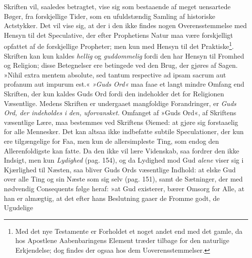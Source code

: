 \documentclass[12pt,a4paper]{book}
\newcommand{\opage}[1]{\marginnote{\footnotesize\textit{[#1]}}}
\begin{document}
Skriften vil, saaledes betragtet, vise sig som bestaaende af meget uensartede Bøger, fra forskjellige Tider, som en ufuldstændig Samling af historiske Actstykker. Det vil vise sig, at der i den ikke findes nogen Overensstemmelse med Hensyn til det Speculative, der efter Prophetiens Natur maa være forskjelligt opfattet af de forskjellige Propheter; men kun med Hensyn til det Praktiske\footnote{Med det nye Testamente er Forholdet et noget andet end med det gamle, da hos Apostlene Aabenbaringens Element træder tilbage for den naturlige Erkjendelse; dog findes der ogsaa hos dem Uoverensstemmelser.}. Skriften kan kun kaldes \emph{hellig} og \emph{guddommelig} fordi den har Hensyn til Fromhed og Religion; disse Betegnelser ere betingede ved den Brug, der gjøres af Sagen. »Nihil extra mentem absolute, sed tantum respective ad ipsam sacrum aut profanum aut impurum est.« \emph{»Guds Ord«} maa faae et langt mindre Omfang end Skriften, der kun kaldes Guds Ord fordi den indeholder det for Religionen Væsentlige. Medens Skriften er undergaaet mangfoldige Forandringer, er \emph{Guds Ord, der indeholdes i den, uforvansket.} Omfanget af »Guds Ord«, af Skriftens væsentlige Lære, maa bestemmes ved Skriftens Øiemed: at gjøre sig forstaaelig for alle Mennesker. Det kan altsaa ikke indbefatte subtile Speculationer, der kun ere tilgængelige for Faa, men kun de allersimpleste Ting, som endog den Allerenfoldigste kan fatte. Da den ikke vil lære Videnskab, saa fordrer den ikke Indsigt, men kun \emph{Lydighed} (pag. 154), og da Lydighed mod Gud \emph{alene} viser sig i Kjærlighed til Næsten, saa bliver Guds Ords væsentlige Indhold: at elske Gud over alle Ting og sin Næste som sig selv (pag. 151), samt de Sætninger, der med nødvendig Consequents følge heraf: »at Gud existerer, bærer Omsorg for Alle, at han er almægtig, at det efter hans Beslutning gaaer de Fromme godt, de Ugudelige
\opage{156} \setcounter{footnote}{0}%
\end{document}
